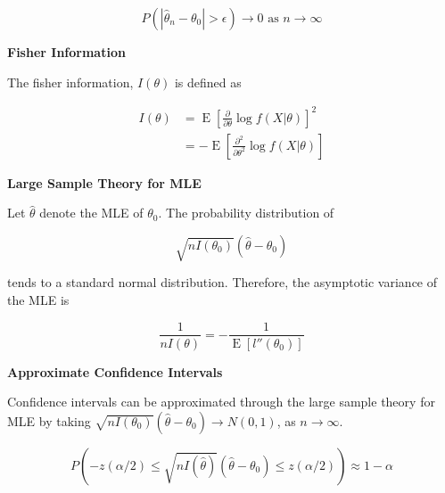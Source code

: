 \documentclass[a4paper]{article}
\newcommand{\subheading}[1]{{\scriptsize\textbf{#1}}}
\newcommand{\expectation}[1]{\operatorname{E}[#1]}
\begin{document}
\begin{multicols*}{4}
$$P(|\hat{\theta}_n - \theta_0| > \epsilon) \rightarrow 0 \text{ as } n
\rightarrow \infty$$

\subheading{Fisher Information}

The fisher information, $I(\theta)$ is defined as

\begin{align*}
  I(\theta) &= \operatorname{E} \left [
    \frac{\partial}{\partial\theta} \log f(X|\theta)
  \right ]^2 \\
    &= - \operatorname{E} \left [
      \frac{\partial^2}{\partial\theta^2} \log f(X|\theta)
  \right ]
\end{align*}

\subheading{Large Sample Theory for MLE}

Let $\hat{\theta}$ denote the MLE of $\theta_0$. The probability distribution of

$$\sqrt{nI(\theta_0)}(\hat{\theta} - \theta_0)$$

tends to a standard normal distribution. Therefore, the asymptotic variance of
the MLE is

$$\frac{1}{nI(\theta)} = - \frac{1}{\expectation{l''(\theta_0)}}$$

\subheading{Approximate Confidence Intervals}

Confidence intervals can be approximated through the large sample theory for MLE
by taking $\sqrt{nI(\theta_0)}(\hat{\theta}-\theta_0) \rightarrow N(0, 1)$, as
$n \rightarrow \infty$. \smallskip

$$P \left (
  -z(\alpha/2) \leq
  \sqrt{nI(\hat{\theta})}(\hat{\theta} - \theta_0) \leq
  z(\alpha/2)
\right ) \approx 1 - \alpha$$

\end{multicols*}
\end{document}
